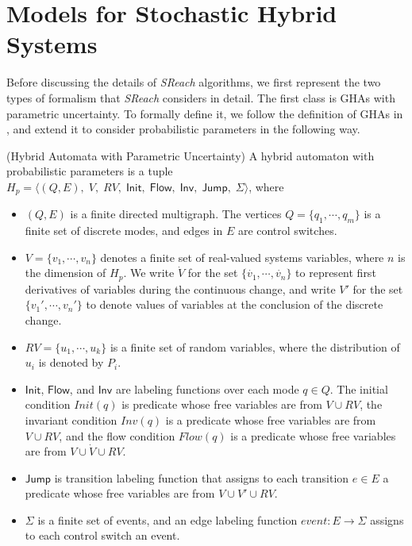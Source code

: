 \section{Models for Stochastic Hybrid Systems}
Before discussing the details of {\it SReach} algorithms, we first represent the two types of formalism that {\it SReach} considers in detail. The first class is GHAs with parametric uncertainty. To formally define it, we follow the definition of GHAs in \cite{henzinger2000theory}, and extend it to consider probabilistic parameters in the following way.
\vspace{-.4cm}
\begin{definition}
\label{def:ha_para}
{\rm(Hybrid Automata with Parametric Uncertainty)} A hybrid automaton with probabilistic parameters is a tuple $H_p = \langle (Q, E), \;V, \;RV, \; \mathsf{Init},\; \mathsf{Flow}, \; \mathsf{Inv}, \; \mathsf{Jump}, \; \Sigma \rangle$, where
\vspace{-.4cm}
\begin{itemize}
\item $(Q, E)$ is a finite directed multigraph. The vertices $Q=\{q_1, \cdots,q_m\}$ is a finite set of discrete modes, and edges in $E$ are control switches.
\vspace{-.2cm}
\item $V = \{ v_1, \cdots, v_n \}$ denotes a finite set of real-valued systems variables, where $n$ is the dimension of $H_p$. We write $\dot{V}$ for the set $\{\dot{v_1}, \cdots, \dot{v_n}\}$ to represent first derivatives of variables during the continuous change, and write $V'$ for the set $\{v_1', \cdots, v_n'\}$ to denote values of variables at the conclusion of the discrete change.
\vspace{-.2cm}
\item $RV = \{ u_1, \cdots, u_k \}$ is a finite set of random variables, where the distribution of $u_i$ is denoted by $P_i$.
\vspace{-.2cm}
\item $\mathsf{Init}$, $\mathsf{Flow}$, and $\mathsf{Inv}$ are labeling functions over each mode $q \in Q$. The initial condition $Init(q)$ is predicate whose free variables are from $V \cup RV$, the invariant condition $Inv(q)$ is a predicate whose free variables are from $V \cup RV$, and the flow condition $Flow(q)$ is a predicate whose free variables are from $V \cup \dot{V} \cup RV$.
\vspace{-.2cm}
\item $\mathsf{Jump}$ is transition labeling function that assigns to each transition $e \in E$ a predicate whose free variables are from $V \cup V' \cup RV$.
\vspace{-.2cm}
\item $\Sigma$ is a finite set of events, and an edge labeling function $event: E \to \Sigma$ assigns to each control switch an event. 
\end{itemize}
\end{definition}
